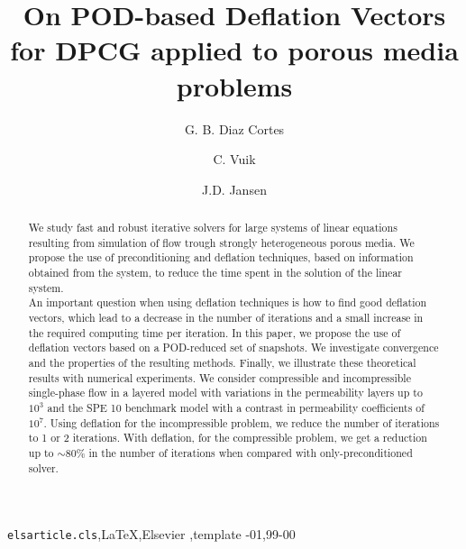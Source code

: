 \documentclass[review]{elsarticle}
\begin{document}
\begin{frontmatter}

\title{On POD-based Deflation Vectors for DPCG applied to porous media problems}


\author[mymainaddress]{G. B. Diaz Cortes}
\author[mymainaddress]{C. Vuik}
\author[mysecondaryaddress] {J.D. Jansen}


\address[mymainaddress]{Faculty of Electrical Engineering, Mathematics and Computer Science, Delft University of Technology,
Mekelweg 4, 2628 CD Delft, The Netherlands
}
\address[mysecondaryaddress]{Faculty of Civil Engineering and Geosciences, Delft University of Technology,
Stevinweg 1, 2628 CN Delft, The Netherlands}

\begin{abstract}
     We study fast and robust iterative solvers for large systems of  linear equations resulting from
     simulation of flow trough strongly heterogeneous porous media. We propose the use of preconditioning and deflation techniques, based on 
     information obtained from the system, to reduce the time spent in the solution of the linear system.\\
     An important question when using deflation techniques is how to find good deflation vectors, which lead to a decrease in the number of iterations 
     and a small increase in the required computing time per iteration. In this paper, we propose the use of deflation vectors
     based on a POD-reduced set of snapshots. We investigate convergence and the properties of the resulting methods. 
     Finally, we illustrate these theoretical results with numerical experiments.  
 We consider compressible and incompressible single-phase flow in a layered model with  variations in the 
 permeability layers up to $10^{3}$ and the SPE 10 benchmark model with a contrast in permeability coefficients of $10^{7}$. Using deflation for the incompressible problem, we reduce the number of iterations to 1 or 2 iterations. With deflation, for the compressible problem, we get a reduction up to $\sim 80\%$ in the number of iterations when compared with only-preconditioned solver.
\end{abstract}

\begin{keyword}
\texttt{elsarticle.cls}\sep \LaTeX\sep Elsevier \sep template
-01\sep  99-00
\end{keyword}

\end{frontmatter}
\end{document}
